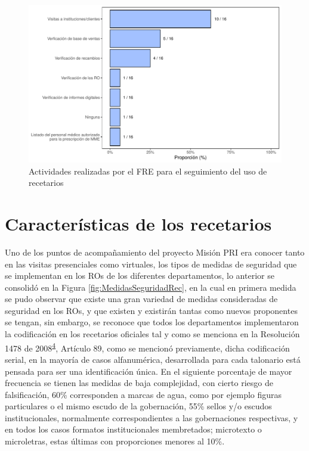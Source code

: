 \documentclass[
]{book}
\begin{document}
\begin{figure}
\includegraphics[width=0.85\linewidth]{InformeFinal_files/figure-latex/SeguimientoUsoRecetarios-1} \caption{Actividades realizadas por el FRE para el seguimiento del uso de recetarios}\label{fig:SeguimientoUsoRecetarios}
\end{figure}

\hypertarget{caracteruxedsticas-de-los-recetarios}{%
\section{Características de los recetarios}\label{caracteruxedsticas-de-los-recetarios}}


Uno de los puntos de acompañamiento del proyecto Misión PRI era conocer tanto en las visitas presenciales como virtuales, los tipos de medidas de seguridad que se implementan en los ROs de los diferentes departamentos, lo anterior se consolidó en la Figura \ref{fig:MedidasSeguridadRec}, en la cual en primera medida se pudo observar que existe una gran variedad de medidas consideradas de seguridad en los ROs, y que existen y existirán tantas como nuevos proponentes se tengan, sin embargo, se reconoce que todos los departamentos implementaron la codificación en los recetarios oficiales tal y como se menciona en la Resolución 1478 de 2008\textsuperscript{\protect\hyperlink{ref-MSPS1478-2006}{4}}, Artículo 89, como se mencionó previamente, dicha codificación serial, en la mayoría de casos alfanumérica, desarrollada para cada talonario está pensada para ser una identificación única. En el siguiente porcentaje de mayor frecuencia se tienen las medidas de baja complejidad, con cierto riesgo de falsificación, 60\% corresponden a marcas de agua, como por ejemplo figuras particulares o el mismo escudo de la gobernación, 55\% sellos y/o escudos institucionales, normalmente correspondientes a las gobernaciones respectivas, y en todos los casos formatos institucionales membretados; microtexto o microletras, estas últimas con proporciones menores al 10\%.
\end{document}
